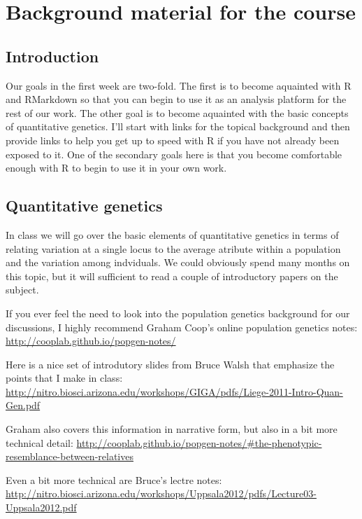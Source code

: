 \documentclass[
]{book}
\begin{document}
\hypertarget{background-material-for-the-course}{%
\chapter{Background material for the course}\label{background-material-for-the-course}}

\hypertarget{introduction}{%
\section{Introduction}\label{introduction}}

Our goals in the first week are two-fold. The first is to become aquainted with R and RMarkdown so that you can begin to use it as an analysis platform for the rest of our work. The other goal is to become aquainted with the basic concepts of quantitative genetics. I'll start with links for the topical background and then provide links to help you get up to speed with R if you have not already been exposed to it. One of the secondary goals here is that you become comfortable enough with R to begin to use it in your own work.

\hypertarget{quantitative-genetics}{%
\section{Quantitative genetics}\label{quantitative-genetics}}

In class we will go over the basic elements of quantitative genetics in terms of relating variation at a single locus to the average atribute within a population and the variation among indviduals. We could obviously spend many months on this topic, but it will sufficient to read a couple of introductory papers on the subject.

If you ever feel the need to look into the population genetics background for our discussions, I highly recommend Graham Coop's online population genetics notes:
\url{http://cooplab.github.io/popgen-notes/}

Here is a nice set of introdutory slides from Bruce Walsh that emphasize the points that I make in class:
\url{http://nitro.biosci.arizona.edu/workshops/GIGA/pdfs/Liege-2011-Intro-Quan-Gen.pdf}

Graham also covers this information in narrative form, but also in a bit more technical detail:
\url{http://cooplab.github.io/popgen-notes/\#the-phenotypic-resemblance-between-relatives}

Even a bit more technical are Bruce's lectre notes:
\url{http://nitro.biosci.arizona.edu/workshops/Uppsala2012/pdfs/Lecture03-Uppsala2012.pdf}
\end{document}
